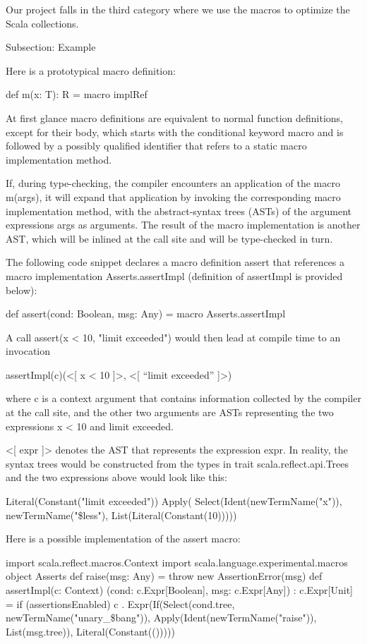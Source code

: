 Our project falls in the third category where we use the macros to optimize the
Scala collections.


Subsection: Example

Here is a prototypical macro definition:

def m(x: T): R = macro implRef

At first glance macro definitions are equivalent to normal function definitions,
except for their body, which starts with the conditional keyword macro and is
followed by a possibly qualified identifier that refers to a static macro
implementation method.

If, during type-checking, the compiler encounters an application of the macro
m(args), it will expand that application by invoking the corresponding macro
implementation method, with the abstract-syntax trees (ASTs) of the argument
expressions args as arguments. The result of the macro implementation is another
AST, which will be inlined at the call site and will be type-checked in turn.

The following code snippet declares a macro definition assert that references a
macro implementation Asserts.assertImpl (definition of assertImpl is provided
below):

def assert(cond: Boolean, msg: Any) = macro Asserts.assertImpl

A call assert(x < 10, "limit exceeded") would then lead at compile time to an
invocation

assertImpl(c)(<[ x < 10 ]>, <[ “limit exceeded” ]>)

where c is a context argument that contains information collected by the
compiler at the call site, and the other two arguments are ASTs representing the
two expressions x < 10 and limit exceeded.

<[ expr ]> denotes the AST that represents the expression expr. In reality, the
syntax trees would be constructed from the types in trait
scala.reflect.api.Trees and the two expressions above would look like this:

Literal(Constant("limit exceeded"))
Apply(
  Select(Ident(newTermName("x")), newTermName("\$less"),
  List(Literal(Constant(10)))))
  
Here is a possible implementation of the assert macro:

import scala.reflect.macros.Context
import scala.language.experimental.macros
object Asserts {
  def raise(msg: Any) = throw new AssertionError(msg)
  def assertImpl(c: Context)
    (cond: c.Expr[Boolean], msg: c.Expr[Any]) : c.Expr[Unit] =
   if (assertionsEnabled)
      c . Expr(If(Select(cond.tree, newTermName("unary_\$bang")),
Apply(Ident(newTermName("raise")), List(msg.tree)), Literal(Constant(()))))
}


